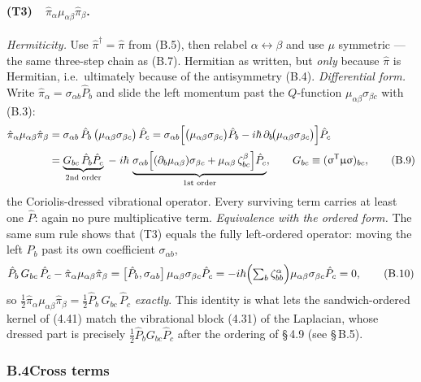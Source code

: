 \paragraph{(T3)\ \ $\hat\pi_\alpha\mu_{\alpha\beta}\hat\pi_\beta$.}
\emph{Hermiticity.} Use $\hat\pi^{\dagger}=\hat\pi$ from (B.5), then relabel $\alpha\leftrightarrow\beta$ and use $\mu$ symmetric --- the same three-step chain as (B.7). Hermitian as written, but \emph{only} because $\hat\pi$ is Hermitian, i.e.\ ultimately because of the antisymmetry (B.4). \emph{Differential form.} Write $\hat\pi_\alpha=\sigma_{\alpha b}\hat P_b$ and slide the left momentum past the $Q$-function $\mu_{\alpha\beta}\sigma_{\beta c}$ with (B.3):
\begin{align}
\hat\pi_\alpha\mu_{\alpha\beta}\hat\pi_\beta
&=\sigma_{\alpha b}\,\hat P_b\,\bigl(\mu_{\alpha\beta}\sigma_{\beta c}\bigr)\,\hat P_c
=\sigma_{\alpha b}\Bigl[\bigl(\mu_{\alpha\beta}\sigma_{\beta c}\bigr)\hat P_b-i\hbar\,\partial_b\!\bigl(\mu_{\alpha\beta}\sigma_{\beta c}\bigr)\Bigr]\hat P_c\nonumber\\[2pt]
&=\underbrace{G_{bc}\,\hat P_b\hat P_c}_{\text{2nd order}}
\;-\;i\hbar\,\underbrace{\sigma_{\alpha b}\Bigl[(\partial_b\mu_{\alpha\beta})\sigma_{\beta c}+\mu_{\alpha\beta}\,\zeta^{\beta}_{bc}\Bigr]\hat P_c}_{\text{1st order}},
\qquad G_{bc}\equiv(\upsigma^{\mathsf T}\upmu\upsigma)_{bc}, \tag{B.9}
\end{align}
the Coriolis-dressed vibrational operator. Every surviving term carries at least one $\hat P$: again no pure multiplicative term. \emph{Equivalence with the ordered form.} The same sum rule shows that (T3) equals the fully left-ordered operator: moving the left $\hat P_b$ past its own coefficient $\sigma_{\alpha b}$,
\begin{equation}
\hat P_b\,G_{bc}\,\hat P_c
-\hat\pi_\alpha\mu_{\alpha\beta}\hat\pi_\beta
=\bigl[\hat P_b,\sigma_{\alpha b}\bigr]\,\mu_{\alpha\beta}\sigma_{\beta c}\hat P_c
=-i\hbar\Bigl(\textstyle\sum_b\zeta^{\alpha}_{bb}\Bigr)\mu_{\alpha\beta}\sigma_{\beta c}\hat P_c=0 , \tag{B.10}
\end{equation}
so $\tfrac12\hat\pi_\alpha\mu_{\alpha\beta}\hat\pi_\beta=\tfrac12\hat P_b\,G_{bc}\,\hat P_c$ \emph{exactly}. This identity is what lets the sandwich-ordered kernel of (4.41) match the vibrational block (4.31) of the Laplacian, whose dressed part is precisely $\tfrac12\hat P_bG_{bc}\hat P_c$ after the ordering of \S\,4.9 (see \S\,B.5).

\subsubsection*{B.4\quad Cross terms}

